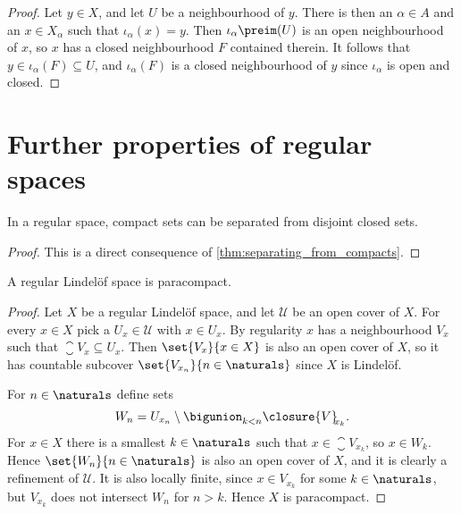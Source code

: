 \documentclass[article, a4paper, 11pt, oneside]{memoir}
\numberwithin{equation}{chapter}
\newcommand{\calU}{\mathcal{U}}
\begin{document}
\begin{proof}
    Let $y \in X$, and let $U$ be a neighbourhood of $y$. There is then an $\alpha \in A$ and an $x \in X_\alpha$ such that $\iota_\alpha(x) = y$. Then $\iota_\alpha\preim(U)$ is an open neighbourhood of $x$, so $x$ has a closed neighbourhood $F$ contained therein. It follows that $y \in \iota_\alpha(F) \subseteq U$, and $\iota_\alpha(F)$ is a closed neighbourhood of $y$ since $\iota_\alpha$ is open and closed.
\end{proof}


\section{Further properties of regular spaces}

\begin{proposition}
    In a regular space, compact sets can be separated from disjoint closed sets.
\end{proposition}

\begin{proof}
    This is a direct consequence of \cref{thm:separating_from_compacts}.
\end{proof}


\begin{proposition}
    \label{thm:regular-Lindelof-is-paracompact}
    A regular Lindelöf space is paracompact.
\end{proposition}

\begin{proof}
    Let $X$ be a regular Lindelöf space, and let $\calU$ be an open cover of $X$. For every $x \in X$ pick a $U_x \in \calU$ with $x \in U_x$. By regularity $x$ has a neighbourhood $V_x$ such that $\closure{V}_{\!\!x} \subseteq U_x$. Then $\set{V_x}{x \in X}$ is also an open cover of $X$, so it has countable subcover $\set{V_{x_n}}{n \in \naturals}$ since $X$ is Lindelöf.

    For $n \in \naturals$ define sets
    \begin{equation*}
        W_n = U_{x_n} \setminus \bigunion_{k < n} \closure{V}_{\!\!x_k}.
    \end{equation*}
    For $x \in X$ there is a smallest $k \in \naturals$ such that $x \in \closure{V}_{\!\!x_k}$, so $x \in W_k$. Hence $\set{W_n}{n \in \naturals}$ is also an open cover of $X$, and it is clearly a refinement of $\calU$. It is also locally finite, since $x \in V_{x_k}$ for some $k \in \naturals$, but $V_{x_k}$ does not intersect $W_n$ for $n > k$. Hence $X$ is paracompact.
\end{proof}
\end{document}
